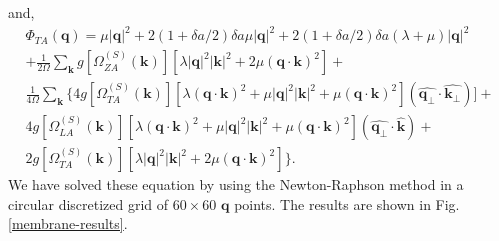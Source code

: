 and,
\begin{multline}
 \Phi_{TA}(\boldsymbol{q})=\mu|\boldsymbol{q}|^{2}+2(1+\delta a/2)\delta a\mu|\boldsymbol{q}|^{2}+2(1+\delta a/2)\delta a(\lambda+\mu)|\boldsymbol{q}|^{2}\\+\frac{1}{2\Omega}\sum_{\boldsymbol{k}}g[\Omega_{ZA}^{
 (S)}(\boldsymbol{k})][\lambda|\boldsymbol{q}|^{2}|\boldsymbol{k}|^{2}+2\mu(\boldsymbol{q}\cdot\boldsymbol{k})^{2}]+\\\frac{1}{4\Omega}\sum_{\boldsymbol{k}}\{
 4g[\Omega_{TA}^{(S)}(\boldsymbol{k})][\lambda(\boldsymbol{q}\cdot\boldsymbol{k})^{2}+\mu|\boldsymbol{q}|^{2}|\boldsymbol{k}|^{2}+\mu(\boldsymbol{q}\cdot\boldsymbol{k})^{2}](\hat{\boldsymbol{q}_{\perp}}\cdot\hat{
 \boldsymbol{k}_{\perp}})]+\\4g[\Omega_{LA}^{(S)}(\boldsymbol{k})][\lambda(\boldsymbol{q}\cdot\boldsymbol{k})^{2}+\mu|\boldsymbol{q}|^{2}|\boldsymbol{k}|^{2}+\mu(\boldsymbol{q}\cdot\boldsymbol{k})^{2}](\hat{\boldsymbol{
 q}_{\perp}}\cdot\hat{\boldsymbol{k}})+ \\ 2g[\Omega_{TA}^{(S)}(\boldsymbol{k})][\lambda|\boldsymbol{q}|^{2}|\boldsymbol{k}|^{2}+2\mu(\boldsymbol{q}\cdot\boldsymbol{k})^{2}]  \}.
\end{multline}
We have solved these equation by using the Newton-Raphson method\cite{ypma1995historical} in a circular discretized grid of $60\times60$ $\boldsymbol{q}$ 
points. The results are shown in Fig. \ref{membrane-results}. 
